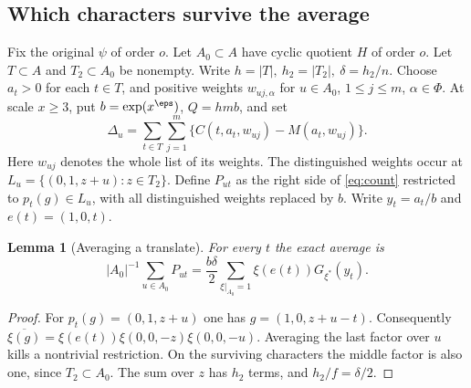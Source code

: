 \documentclass[a4paper,11pt]{article}
\newtheorem{lemma}[proposition]{Lemma}
\theoremstyle{definition}
\theoremstyle{remark}
\numberwithin{equation}{section}
\begin{document}
\subsection{Which characters survive the average}\label{nav:I-24}
Fix the original \(\psi\) of order \(o\). Let \(A_0\subset A\) have cyclic quotient \(H\) of order \(o\). Let \(T\subset A\) and \(T_2\subset A_0\) be nonempty. Write \(h=|T|,\ h_2=|T_2|,\ \delta=h_2/n\). Choose \(a_t>0\) for each \(t\in T\), and positive weights \(w_{uj,\alpha}\) for \(u\in A_0\), \(1\le j\le m\), \(\alpha\in\Phi\). At scale \(x\ge3\), put \(b=\exp(x^\eps)\), \(Q=hmb\), and set
\[
 \Delta_u=\sum_{t\in T}\sum_{j=1}^m
      \{C(t,a_t,w_{uj})-M(a_t,w_{uj})\}.
\]
Here \(w_{uj}\) denotes the whole list of its weights. The distinguished weights occur at \(L_u=\{(0,1,z+u):z\in T_2\}\). Define \(P_{ut}\) as the right side of \eqref{eq:count} restricted to \(p_t(g)\in L_u\), with all distinguished weights replaced by \(b\). Write \(y_t=a_t/b\) and \(e(t)=(1,0,t)\).

\begin{lemma}[Averaging a translate]\label{lem:av10}
For every \(t\) the exact average is
\[
 |A_0|^{-1}\sum_{u\in A_0}P_{ut}
    =\frac{b\delta}{2}\sum_{\xi|_{A_0}=1}\xi(e(t))G_{\xi^*}(y_t).
\]
\end{lemma}
\begin{proof}
For \(p_t(g)=(0,1,z+u)\) one has \(g=(1,0,z+u-t)\). Consequently \(\overline{\xi(g)}=\xi(e(t))\xi(0,0,-z)\xi(0,0,-u)\). Averaging the last factor over \(u\) kills a nontrivial restriction. On the surviving characters the middle factor is also one, since \(T_2\subset A_0\). The sum over \(z\) has \(h_2\) terms, and \(h_2/f=\delta/2\).
\end{proof}
\end{document}
